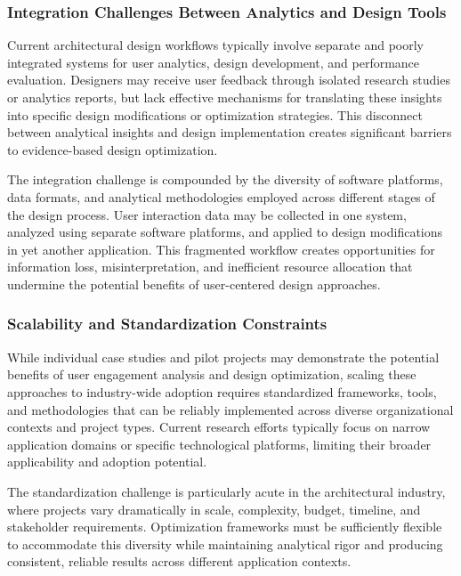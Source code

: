 \documentclass[12pt,a4paper]{book}
\begin{document}
\subsubsection{Integration Challenges Between Analytics and Design Tools}
\label{subsubsec:integration_challenges}

Current architectural design workflows typically involve separate and poorly integrated systems for user analytics, design development, and performance evaluation. Designers may receive user feedback through isolated research studies or analytics reports, but lack effective mechanisms for translating these insights into specific design modifications or optimization strategies. This disconnect between analytical insights and design implementation creates significant barriers to evidence-based design optimization.

The integration challenge is compounded by the diversity of software platforms, data formats, and analytical methodologies employed across different stages of the design process. User interaction data may be collected in one system, analyzed using separate software platforms, and applied to design modifications in yet another application. This fragmented workflow creates opportunities for information loss, misinterpretation, and inefficient resource allocation that undermine the potential benefits of user-centered design approaches.

\subsubsection{Scalability and Standardization Constraints}
\label{subsubsec:scalability_constraints}

While individual case studies and pilot projects may demonstrate the potential benefits of user engagement analysis and design optimization, scaling these approaches to industry-wide adoption requires standardized frameworks, tools, and methodologies that can be reliably implemented across diverse organizational contexts and project types. Current research efforts typically focus on narrow application domains or specific technological platforms, limiting their broader applicability and adoption potential.

The standardization challenge is particularly acute in the architectural industry, where projects vary dramatically in scale, complexity, budget, timeline, and stakeholder requirements. Optimization frameworks must be sufficiently flexible to accommodate this diversity while maintaining analytical rigor and producing consistent, reliable results across different application contexts.
\end{document}
